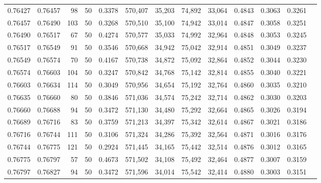 \begin{tabular}{rrrrrrrrrrrrr}
0.76427 & 0.76457 &    98 &  50 &                                     0.3378 & 570,407 &  35,203 &  74,892 &  33,064 & 0.4843 & 0.3063 & 0.3261 \\
0.76457 & 0.76490 &   103 &  50 &                                     0.3268 & 570,510 &  35,100 &  74,942 &  33,014 & 0.4847 & 0.3058 & 0.3251 \\
0.76490 & 0.76517 &    67 &  50 &                                     0.4274 & 570,577 &  35,033 &  74,992 &  32,964 & 0.4848 & 0.3053 & 0.3245 \\
0.76517 & 0.76549 &    91 &  50 &                                     0.3546 & 570,668 &  34,942 &  75,042 &  32,914 & 0.4851 & 0.3049 & 0.3237 \\
0.76549 & 0.76574 &    70 &  50 &                                     0.4167 & 570,738 &  34,872 &  75,092 &  32,864 & 0.4852 & 0.3044 & 0.3230 \\
0.76574 & 0.76603 &   104 &  50 &                                     0.3247 & 570,842 &  34,768 &  75,142 &  32,814 & 0.4855 & 0.3040 & 0.3221 \\
0.76603 & 0.76634 &   114 &  50 &                                     0.3049 & 570,956 &  34,654 &  75,192 &  32,764 & 0.4860 & 0.3035 & 0.3210 \\
0.76635 & 0.76660 &    80 &  50 &                                     0.3846 & 571,036 &  34,574 &  75,242 &  32,714 & 0.4862 & 0.3030 & 0.3203 \\
0.76660 & 0.76688 &    94 &  50 &                                     0.3472 & 571,130 &  34,480 &  75,292 &  32,664 & 0.4865 & 0.3026 & 0.3194 \\
0.76689 & 0.76716 &    83 &  50 &                                     0.3759 & 571,213 &  34,397 &  75,342 &  32,614 & 0.4867 & 0.3021 & 0.3186 \\
0.76716 & 0.76744 &   111 &  50 &                                     0.3106 & 571,324 &  34,286 &  75,392 &  32,564 & 0.4871 & 0.3016 & 0.3176 \\
0.76744 & 0.76775 &   121 &  50 &                                     0.2924 & 571,445 &  34,165 &  75,442 &  32,514 & 0.4876 & 0.3012 & 0.3165 \\
0.76775 & 0.76797 &    57 &  50 &                                     0.4673 & 571,502 &  34,108 &  75,492 &  32,464 & 0.4877 & 0.3007 & 0.3159 \\
0.76797 & 0.76827 &    94 &  50 &                                     0.3472 & 571,596 &  34,014 &  75,542 &  32,414 & 0.4880 & 0.3003 & 0.3151 \\

\end{tabular}
